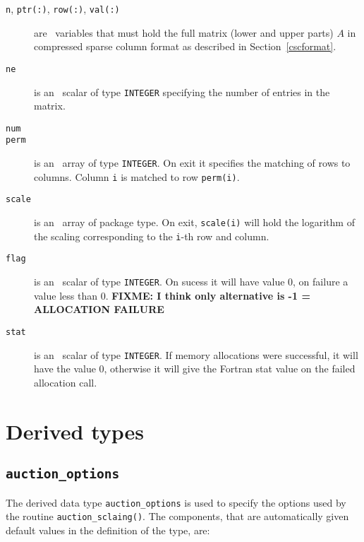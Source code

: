 \begin{description}

\item[\texttt{n}, \texttt{ptr(:)}, \texttt{row(:)}, \texttt{val(:)}] are
\intentin\ variables that must hold the full matrix (lower and upper parts)
$A$ in compressed sparse column format as described in Section~\ref{cscformat}.

\item[\texttt{ne}] is an \intentin\ scalar of type {\tt INTEGER} specifying the
number of entries in the matrix.

\item[\texttt{num}]

\item[\texttt{perm}] is an \intentout\ array of type {\tt INTEGER}. On exit it
specifies the matching of rows to columns. Column \texttt{i} is matched to row
\texttt{perm(i)}.

\item[\texttt{scale}] is an \intentout\ array of package type. On exit,
\texttt{scale(i)} will hold the logarithm of the scaling corresponding to the
\texttt{i}-th row and column.

\item[\texttt{flag}] is an \intentout\ scalar of type {\tt INTEGER}. On sucess it will have value 0, on failure a value less than 0. \textbf{FIXME: I think only alternative is -1 = ALLOCATION FAILURE}

\item[\texttt{stat}] is an \intentout\ scalar of type {\tt INTEGER}. If memory allocations were successful, it will have the value 0, otherwise it will give the
Fortran stat value on the failed allocation call.

\end{description}

\section{Derived types}
\subsection{\texttt{auction\_options}} \label{type:auction_options}

The derived data type \texttt{auction\_options} is used to specify the options used by the routine \texttt{auction\_sclaing()}. The components, that are automatically given default values in the definition of the type, are:

